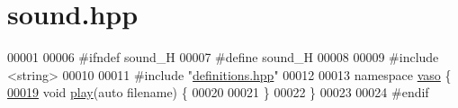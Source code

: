 \hypertarget{sound_8hpp_source}{\section{sound.\+hpp}
\label{sound_8hpp_source}
}

\begin{DoxyCode}
00001 
00006 \textcolor{preprocessor}{#ifndef sound\_H}
00007 \textcolor{preprocessor}{#define sound\_H}
00008 
00009 \textcolor{preprocessor}{#include <string>}
00010 
00011 \textcolor{preprocessor}{#include "\hyperlink{definitions_8hpp}{definitions.hpp}"}
00012 
00013 \textcolor{keyword}{namespace }\hyperlink{namespacevaso}{vaso} \{
\hypertarget{sound_8hpp_source_l00019}{}\hyperlink{namespacevaso_a7da499b9b1b5a492bea8ab8681e57c22}{00019}     \textcolor{keywordtype}{void} \hyperlink{namespacevaso_a7da499b9b1b5a492bea8ab8681e57c22}{play}(\textcolor{keyword}{auto} filename) \{
00020 
00021     \}
00022 \}
00023 
00024 \textcolor{preprocessor}{#endif}
\end{DoxyCode}
